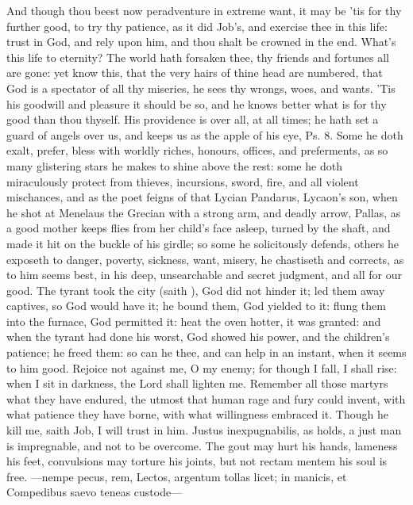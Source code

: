 {And though thou beest now peradventure in extreme want, it may be
'tis for thy further good, to try thy patience, as it did Job's, and
exercise thee in this life: trust in God, and rely upon him, and thou
shalt be crowned in the end. What's this life to eternity? The
world hath forsaken thee, thy friends and fortunes all are gone: yet
know this, that the very hairs of thine head are numbered, that God is
a spectator of all thy miseries, he sees thy wrongs, woes, and wants.
'Tis his goodwill and pleasure it should be so, and he knows
better what is for thy good than thou thyself. His providence is over
all, at all times; he hath set a guard of angels over us, and keeps us
as the apple of his eye, Ps.  8. Some he doth exalt, prefer, bless
with worldly riches, honours, offices, and preferments, as so many
glistering stars he makes to shine above the rest: some he doth
miraculously protect from thieves, incursions, sword, fire, and all
violent mischances, and as the poet feigns of that Lycian
Pandarus, Lycaon's son, when he shot at Menelaus the Grecian with a
strong arm, and deadly arrow, Pallas, as a good mother keeps flies from
her child's face asleep, turned by the shaft, and made it hit on the
buckle of his girdle; so some he solicitously defends, others he
exposeth to danger, poverty, sickness, want, misery, he chastiseth and
corrects, as to him seems best, in his deep, unsearchable and secret
judgment, and all for our good. The tyrant took the city (saith
\Chrysostom), God did not hinder it; led them away captives, so
God would have it; he bound them, God yielded to it: flung them into
the furnace, God permitted it: heat the oven hotter, it was granted:
and when the tyrant had done his worst, God showed his power, and the
children's patience; he freed them: so can he thee, and can help
in an instant, when it seems to him good.  Rejoice not against
me, O my enemy; for though I fall, I shall rise: when I sit in
darkness, the Lord shall lighten me. Remember all those martyrs what
they have endured, the utmost that human rage and fury could invent,
with what patience they have borne, with what willingness
embraced it. Though he kill me, saith Job, I will trust in him. Justus
inexpugnabilis, as \Chrysostom holds, a just man is impregnable,
and not to be overcome. The gout may hurt his hands, lameness his feet,
convulsions may torture his joints, but not rectam mentem his soul is
free.
---nempe pecus, rem,
Lectos, argentum tollas licet; in manicis, et
Compedibus saevo teneas custode---

}
